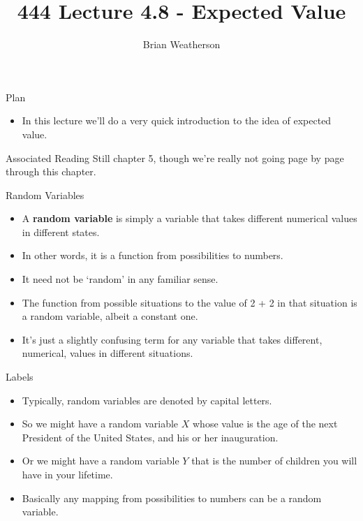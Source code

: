 \documentclass[
  ignorenonframetext,
]{beamer}
\title{444 Lecture 4.8 - Expected Value}
\author{Brian Weatherson}
\date{}
\providecommand{\tightlist}{%
  \setlength{\itemsep}{0pt}\setlength{\parskip}{0pt}}
\begin{document}
\frame{\titlepage}

\begin{frame}{Plan}
\protect\hypertarget{plan}{}
\begin{itemize}
\tightlist
\item
  In this lecture we'll do a very quick introduction to the idea of
  expected value.
\end{itemize}
\end{frame}

\begin{frame}{Associated Reading}
\protect\hypertarget{associated-reading}{}
Still chapter 5, though we're really not going page by page through this
chapter.
\end{frame}

\begin{frame}{Random Variables}
\protect\hypertarget{random-variables}{}
\begin{itemize}
\tightlist
\item
  A \textbf{random variable} is simply a variable that takes different
  numerical values in different states.
\item
  In other words, it is a function from possibilities to numbers.
\item
  It need not be `random' in any familiar sense.
\item
  The function from possible situations to the value of 2 + 2 in that
  situation is a random variable, albeit a constant one.
\item
  It's just a slightly confusing term for any variable that takes
  different, numerical, values in different situations.
\end{itemize}
\end{frame}

\begin{frame}{Labels}
\protect\hypertarget{labels}{}
\begin{itemize}
\tightlist
\item
  Typically, random variables are denoted by capital letters.
\item
  So we might have a random variable \(X\) whose value is the age of the
  next President of the United States, and his or her inauguration.
\item
  Or we might have a random variable \(Y\) that is the number of
  children you will have in your lifetime.
\item
  Basically any mapping from possibilities to numbers can be a random
  variable.
\end{itemize}
\end{frame}
\end{document}
